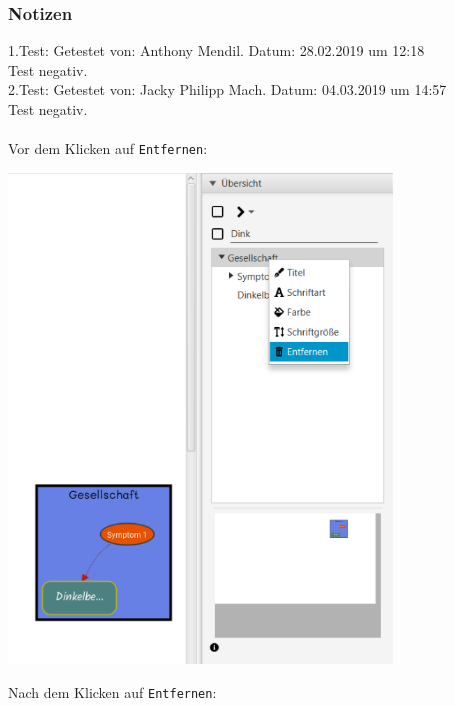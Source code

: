 \documentclass[enabledeprecatedfontcommands]{scrartcl}
\begin{document}
\subsubsection{Notizen}
1.Test: Getestet von: Anthony Mendil. Datum: 28.02.2019 um 12:18 \\
Test negativ.\\
2.Test: Getestet von: Jacky Philipp Mach. Datum: 04.03.2019 um 14:57 \\
Test negativ.\\\\
Vor dem Klicken auf \texttt{Entfernen}:
\begin{center}
\includegraphics[height=13cm]{sphareMitRechtsklickLoeschenVorher.PNG}
\end{center}
\newpage
Nach dem Klicken auf \texttt{Entfernen}: 
\end{document}
